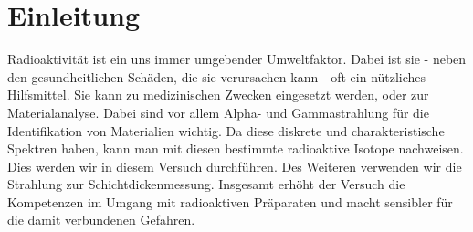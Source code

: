 

\chapter{Einleitung}
\label{chap:einleitung}

Radioaktivität ist ein uns immer umgebender Umweltfaktor. Dabei ist sie - neben den gesundheitlichen Schäden, die sie verursachen 
kann - oft ein nützliches Hilfsmittel. Sie kann zu medizinischen Zwecken eingesetzt werden, oder zur Materialanalyse. 
Dabei sind vor allem Alpha- und Gammastrahlung für die Identifikation von Materialien wichtig. Da diese diskrete und charakteristische 
Spektren haben, kann man mit diesen bestimmte radioaktive Isotope nachweisen. Dies werden wir in diesem Versuch durchführen. Des Weiteren 
verwenden wir die Strahlung zur Schichtdickenmessung. Insgesamt erhöht der Versuch die Kompetenzen im Umgang mit radioaktiven Präparaten und 
macht sensibler für die damit verbundenen Gefahren.
